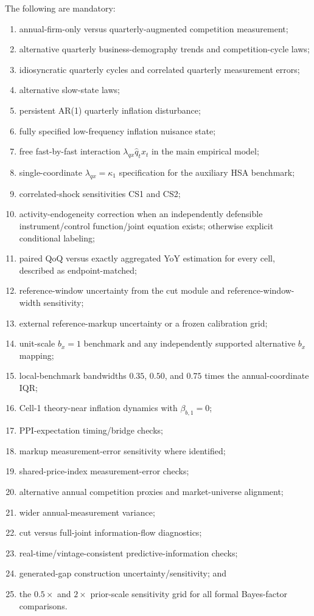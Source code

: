 \documentclass[11pt]{article}
\begin{document}
The following are mandatory:
\begin{enumerate}
\item annual-firm-only versus quarterly-augmented competition measurement;
\item alternative quarterly business-demography trends and competition-cycle laws;
\item idiosyncratic quarterly cycles and correlated quarterly measurement errors;
\item alternative slow-state laws;
\item persistent AR(1) quarterly inflation disturbance;
\item fully specified low-frequency inflation nuisance state;
\item free fast-by-fast interaction $\lambda_{qx}\hat q_tx_t$ in the main empirical model;
\item single-coordinate $\lambda_{qx}=\kappa_1$ specification for the auxiliary HSA benchmark;
\item correlated-shock sensitivities CS1 and CS2;
\item activity-endogeneity correction when an independently defensible instrument/control function/joint equation exists; otherwise explicit conditional labeling;
\item paired QoQ versus exactly aggregated YoY estimation for every cell, described as endpoint-matched;
\item reference-window uncertainty from the cut module and reference-window-width sensitivity;
\item external reference-markup uncertainty or a frozen calibration grid;
\item unit-scale $b_x=1$ benchmark and any independently supported alternative $b_x$ mapping;
\item local-benchmark bandwidths $0.35$, $0.50$, and $0.75$ times the annual-coordinate IQR;
\item Cell-1 theory-near inflation dynamics with $\beta_{b,1}=0$;
\item PPI-expectation timing/bridge checks;
\item markup measurement-error sensitivity where identified;
\item shared-price-index measurement-error checks;
\item alternative annual competition proxies and market-universe alignment;
\item wider annual-measurement variance;
\item cut versus full-joint information-flow diagnostics;
\item real-time/vintage-consistent predictive-information checks;
\item generated-gap construction uncertainty/sensitivity; and
\item the $0.5\times$ and $2\times$ prior-scale sensitivity grid for all formal Bayes-factor comparisons.
\end{enumerate}
\end{document}
